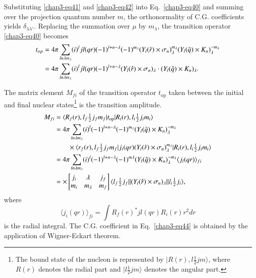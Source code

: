 Substituting \eqref{chap3-eq41} and \eqref{chap3-eq42} into Eq.\ \eqref{chap3-eq40} and summing over the projection quantum number $m$, the orthonormality of C.G. coefficients yields $\delta_{\lambda \lambda'}$. Replacing the summation over $\mu$ by $m_{\lambda}$, the transition operator \eqref{chap3-eq40} becomes
\begin{align}
  t_{op} & = 4 \pi \sum_{ln \lambda m_\lambda} (i)^l jl (qr) (-1)^{l + n - \lambda} (-1)^{m_\lambda} (Y_l({\boldmath \hat{r}}) \times \sigma_n)_\lambda^{m_\lambda} (Y_l ({\boldmath \hat{q}}) \times {\boldmath K}_n)_\lambda^{-m_\lambda} \notag \\
  & = 4 \pi \sum_{ln \lambda m_\lambda} (i)^l jl (qr) (-1)^{l+n-\lambda} (Y_l ({\boldmath \hat{r}}) \times \sigma_{n})_\lambda \cdot (Y_l ({\boldmath \hat{q}}) \times {\boldmath K}_n)_\lambda. \label{chap3-eq43}
\end{align}

The matrix element $M_{fi}$ of the transition operator $t_{\text{op}}$ taken between the initial and final nuclear states\footnote{The bound state of the nucleon is represented by $|R(r), l \tfrac{1}{2} jm \rangle$, where $R(r)$ denotes the radial part and $|l\tfrac{1}{2} jm \rangle$ denotes the angular part.} is the transition amplitude.
\begin{align}
  M_{fi} & = \langle R_f (r), l_f \tfrac{1}{2} j_f m_f| t_{\text{op}}| R_i (r) , l_i \tfrac{1}{2} j_i m_i \rangle \notag \\
  & = 4 \pi \sum_{ln\lambda m_\lambda} (i)^l (-1)^{l + n -\lambda} (-1)^{m_\lambda} (Y_l ({{\hat{\boldmath q}}}) \times {\boldmath K}_n)_{\lambda}^{-m_\lambda} \notag \\
  & \qquad \times \langle r_f (r), l_f \tfrac{1}{2} j_f m_f | j_i (qr) (Y_l ({\boldmath \hat{r}}) \times \sigma_n)_\lambda^{m_\lambda} |R_i (r), l_i \tfrac{1}{2} j_i m_i \rangle \notag \\
  & = 4\pi \sum_{ln \lambda m_\lambda} (i)^l (-1)^{l + n -\lambda} (-1)^{m \lambda} (Y_l({\boldmath \hat{q}})\times {\boldmath K}_n)^{-m_\lambda}_\lambda \langle j_l (qr)\rangle_{fi}\notag \\
  & = \times \begin{bmatrix} j_i & \lambda & j_f \\ m_i & m_\lambda & m_f \end{bmatrix}
  \langle l_f \tfrac{1}{2} j_f || (Y_l ({\boldmath \hat{r}}) \times \sigma_n)_\lambda|| l_i \tfrac{1}{2} j_i \rangle, \label{chap3-eq44}
\end{align}
where
$$
\langle j_i (qr)\rangle_{fi} = \int R_f (r)^\ast jl (qr) R_i (r) r^2 dr
$$
is the radial integral. The C.G. coefficient in Eq.\ \eqref{chap3-eq44} is obtained by the application of Wigner-Eckart theorem.

